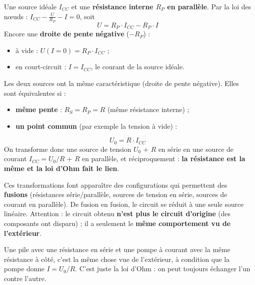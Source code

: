 
\begin{defnbox}[title={Source linéaire de courant}]
Une source idéale $I_{CC}$ et une \textbf{résistance interne $R_P$ en parallèle}. Par la loi
des n\oe uds : $I_{CC} - \frac{U}{R_P} - I = 0$, soit
\[ U = R_P\cdot I_{CC} - R_P\cdot I \]
Encore une \textbf{droite de pente négative} ($-R_P$) :
\begin{itemize}
  \item à vide : $U(I = 0) = R_P\cdot I_{CC}$ ;
  \item en court-circuit : $I = I_{CC}$, le courant de la source idéale.
\end{itemize}
\end{defnbox}


\begin{thmbox}[title={Équivalence source de tension $\leftrightarrow$ source de courant}]
Les deux sources ont la même caractéristique (droite de pente négative). Elles sont
équivalentes si :
\begin{itemize}
  \item \textbf{même pente} : $R_S = R_P = R$ (même résistance interne) ;
  \item \textbf{un point commun} (par exemple la tension à vide) :
\end{itemize}
\[ \boxed{U_0 = R\cdot I_{CC}} \]
On transforme donc une source de tension $U_0$ + $R$ en série en une source de courant
$I_{CC} = U_0/R$ + $R$ en parallèle, et réciproquement : \textbf{la résistance est la même et
la loi d'Ohm fait le lien}.
\end{thmbox}

\begin{warnbox}[title={À quoi ça sert, et la limite}]
Ces transformations font apparaître des configurations qui permettent des
\textbf{fusions} (résistances série/parallèle, sources de tension en série, sources de courant
en parallèle). De fusion en fusion, le circuit se réduit à une seule source linéaire.
Attention : le circuit obtenu \textbf{n'est plus le circuit d'origine} (des composants ont
disparu) ; il a seulement le \textbf{même comportement vu de l'extérieur}.
\end{warnbox}

\begin{goatbox}
Une pile avec une résistance en série et une \og pompe à courant\fg{} avec la même résistance
à côté, c'est la même chose vue de l'extérieur, à condition que la pompe donne
$I = U_0/R$. C'est juste la loi d'Ohm : on peut toujours échanger l'un contre l'autre.
\end{goatbox}

